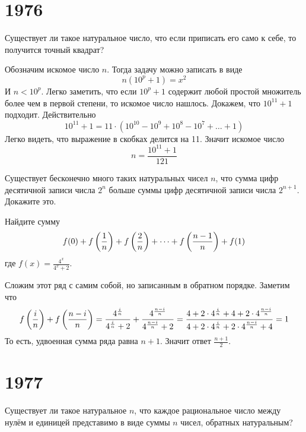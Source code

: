 \documentclass[11pt, a4paper]{template}
\begin{document}
\chapter{1976}

\begin{exercise}[M387]
Существует ли такое натуральное число, что если приписать его само к себе, то получится точный квадрат? 
\end{exercise}

\begin{solution}
Обозначим искомое число $n$. Тогда задачу можно записать в виде
$$
n(10^{p}+1) = x^{2}
$$
И $n < 10^{p}$. Легко заметить, что если $10^{p} + 1$ содержит любой простой множитель более чем в первой степени, то искомое число нашлось. Докажем, что $10^{11}+1$ подходит. Действительно
$$
10^{11}+1 = 11 \cdot (10^{10} - 10^{9} + 10^{8} - 10^{7} + \dots + 1)
$$
Легко видеть, что выражение в скобках делится на 11. Значит искомое число
$$
n = \frac{10^{11} + 1}{121}
$$ 
\end{solution}

\begin{exercise}[M390]
Существует бесконечно много таких натуральных чисел $n$, что сумма цифр десятичной записи числа $2^{n}$ больше суммы цифр десятичной записи числа $2^{n+1}$. Докажите это.
\end{exercise}

\begin{exercise}[M393]
Найдите сумму
$$
f(0) + f\left(\frac{1}{n}\right) + f\left(\frac{2}{n}\right) + \dots + f\left(\frac{n-1}{n}\right) + f(1) 
$$
где $f(x) = \frac{4^{x}}{4^{x}+2}$.
\end{exercise}

\begin{solution}
Сложим этот ряд с самим собой, но записанным в обратном порядке. Заметим что
$$
f\left(\frac{i}{n}\right) + f\left(\frac{n-i}{n}\right) = \frac{4^{\frac{i}{n}}}{4^{\frac{i}{n}}+2} + \frac{4^{\frac{n-i}{n}}}{4^{\frac{n-i}{n}}+2} = \frac{4 + 2 \cdot 4^{\frac{i}{n}} + 4 + 2 \cdot 4^{\frac{n-i}{n}}}{4 + 2 \cdot 4^{\frac{i}{n}} + 2 \cdot 4^{\frac{n-i}{n}} + 4} = 1
$$
То есть, удвоенная сумма ряда равна $n + 1$. Значит ответ $\frac{n+1}{2}$.
\end{solution}

\chapter{1977}

\begin{exercise}[M425]
Существует ли такое натуральное $n$, что каждое рациональное число между нулём и единицей представимо в виде суммы $n$ чисел, обратных натуральным?
\end{exercise}
\end{document}
